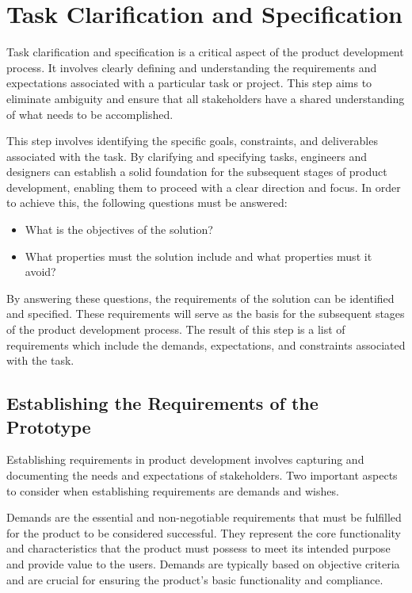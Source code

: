 \chapter{Task Clarification and Specification}

Task clarification and specification is a critical aspect of the product development process. It involves clearly defining and understanding the requirements and expectations associated with a particular task or project. This step aims to eliminate ambiguity and ensure that all stakeholders have a shared understanding of what needs to be accomplished.

This step involves identifying the specific goals, constraints, and deliverables associated with the task. By clarifying and specifying tasks, engineers and designers can establish a solid foundation for the subsequent stages of product development, enabling them to proceed with a clear direction and focus. In order to achieve this, the following questions must be answered:

\begin{itemize}
    \item What is the objectives of the solution?
    \item What properties must the solution include and what properties must it avoid?
\end{itemize}

By answering these questions, the requirements of the solution can be identified and specified. These requirements will serve as the basis for the subsequent stages of the product development process. The result of this step is a list of requirements which include the demands, expectations, and constraints associated with the task. \cite{Pahl07a}

\section{Establishing the Requirements of the Prototype}
Establishing requirements in product development involves capturing and documenting the needs and expectations of stakeholders. Two important aspects to consider when establishing requirements are demands and wishes.

Demands are the essential and non-negotiable requirements that must be fulfilled for the product to be considered successful. They represent the core functionality and characteristics that the product must possess to meet its intended purpose and provide value to the users. Demands are typically based on objective criteria and are crucial for ensuring the product's basic functionality and compliance.

